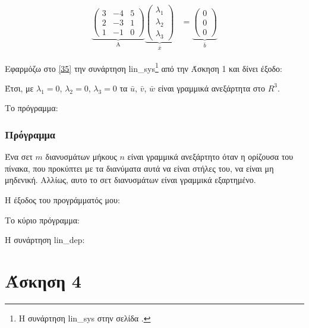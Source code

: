 \documentclass[12pt, fleqn, leqno]{extreport}
\begin{document}
\begin{equation}
    \begin{aligned}%
        \underbrace{
            \begin{pmatrix}
                3 & -4 & 5 \\
                2 & -3 & 1 \\
                1 & -1 & 0
            \end{pmatrix}
        }_\text{A}
        \underbrace{
            \begin{pmatrix}
                \lambda_{1} \\
                \lambda_{2} \\
                \lambda_{3}
            \end{pmatrix}
        }_\text{$\bar{x}$}
         & =
        \underbrace{
            \begin{pmatrix}
                0 \\
                0 \\
                0
            \end{pmatrix}
        }_\text{$\bar{b}$}
    \end{aligned}\label{35}
\end{equation}

Εφαρμόζω στο \eqref{35} την συνάρτηση lin\_sys\footnote{Η συνάρτηση lin\_sys στην σελίδα \pageref{lin_sys}.} από την Άσκηση 1 και δίνει έξοδο:

Έτσι, με $\lambda_{1} = 0$, $\lambda_{2} = 0$, $\lambda_{3} = 0$ τα $\bar{u}$, $\bar{v}$, $\bar{w}$ είναι γραμμικά ανεξάρτητα στο $R^{3}$.

Το πρόγραμμα:

\newpage

\subsection{Πρόγραμμα}

Ένα σετ $m$ διανυσμάτων μήκους $n$ είναι γραμμικά ανεξάρτητο όταν η ορίζουσα του πίνακα, που προκύπτει με τα διανύματα αυτά να είναι στήλες του, να είναι μη μηδενική. Αλλίως, αυτο το σετ διανυσμάτων είναι γραμμικά εξαρτημένο.

Η έξοδος του προγράμματός μου:


Το κύριο πρόγραμμα:


Η συνάρτηση lin\_dep:


\chapter{Άσκηση 4}
\end{document}
